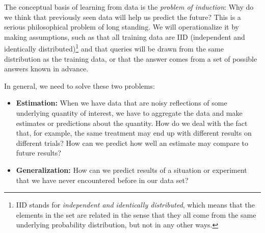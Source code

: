 \documentclass[11pt]{article}
\newcommand{\note}[1]{\todo[color=blue!10,
  linecolor=blue!90,size=\small]{\linespread{0.9}\selectfont{#1}\par}}
\renewcommand{\note}[1]{\footnote{#1}}
\begin{document}

The conceptual basis of learning from data is the {\em problem of
  induction}: %
  Why do we think that
previously seen data will help us predict the future?  This is a
serious philosophical problem of long standing.  We will
operationalize it by making assumptions, such as that all training
data are IID (independent and identically distributed)\note{IID stands for {\em independent and identically distributed},
  which means that the elements in the set are related in the sense
  that they all come from the same underlying probability
  distribution, but not in any other ways.} and that
queries will be drawn from the same distribution as the training data,
or that the answer comes from a set of possible answers known in
advance.

In general, we need to solve these two problems:
\begin{itemize}
\item {\bf Estimation:}  When we have data that are noisy reflections
  of some underlying quantity of interest, we have to aggregate the
  data and make estimates or predictions about the quantity.
  How do we deal with the fact that, for
  example, the same treatment may end up with different results on
  different trials?  How can we predict how well an estimate may
  compare to future results?
\item {\bf Generalization:} How can we predict results of a situation
  or experiment that we have never encountered before in our data set?
\end{itemize}
\end{document}
